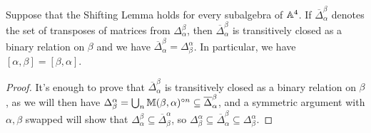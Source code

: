 \documentclass[letterpaper,11pt]{article}
\begin{document}
\begin{thm}\label{commutator-transpose} Suppose that the Shifting Lemma holds for every subalgebra of $\mathbb{A}^4$. If $\overline{\Delta}_\alpha^\beta$ denotes the set of transposes of matrices from $\Delta_\alpha^\beta$, then $\overline{\Delta}_\alpha^\beta$ is transitively closed as a binary relation on $\beta$ and we have $\overline{\Delta}_\alpha^\beta = \Delta_\beta^\alpha$. In particular, we have $[\alpha,\beta] = [\beta,\alpha]$.
\end{thm}
\begin{proof} It's enough to prove that $\overline{\Delta}_\alpha^\beta$ is transitively closed as a binary relation on $\beta$, as we will then have $\Delta_\beta^\alpha = \bigcup_n \mathbb{M}(\beta,\alpha)^{\circ n} \subseteq \overline{\Delta}_\alpha^\beta$, and a symmetric argument with $\alpha,\beta$ swapped will show that $\Delta_\alpha^\beta \subseteq \overline{\Delta}_\beta^\alpha$, so $\Delta_\beta^\alpha \subseteq \overline{\Delta}_\alpha^\beta \subseteq \Delta_\beta^\alpha$.


\end{proof}
\end{document}
